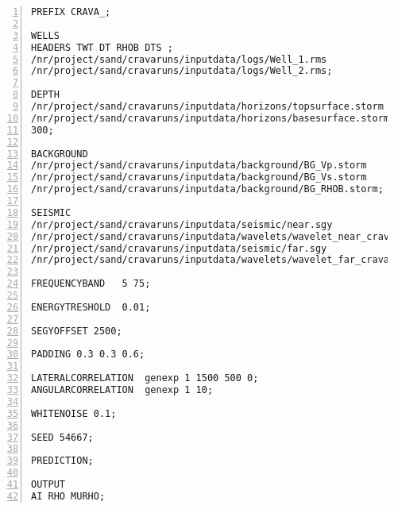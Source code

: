 \documentclass[screen,note,long,backref,indentpar]{nrdoc}
\begin{document}
\begin{small}
\begin{Verbatim}[numbers=left]
PREFIX CRAVA_;

WELLS
HEADERS TWT DT RHOB DTS ;
/nr/project/sand/cravaruns/inputdata/logs/Well_1.rms
/nr/project/sand/cravaruns/inputdata/logs/Well_2.rms;

DEPTH
/nr/project/sand/cravaruns/inputdata/horizons/topsurface.storm
/nr/project/sand/cravaruns/inputdata/horizons/basesurface.storm
300;

BACKGROUND
/nr/project/sand/cravaruns/inputdata/background/BG_Vp.storm
/nr/project/sand/cravaruns/inputdata/background/BG_Vs.storm
/nr/project/sand/cravaruns/inputdata/background/BG_RHOB.storm;

SEISMIC
/nr/project/sand/cravaruns/inputdata/seismic/near.sgy                  15 .35
/nr/project/sand/cravaruns/inputdata/wavelets/wavelet_near_crava.txt             -0.80
/nr/project/sand/cravaruns/inputdata/seismic/far.sgy                   40 .39
/nr/project/sand/cravaruns/inputdata/wavelets/wavelet_far_crava.txt              -0.90;

FREQUENCYBAND   5 75;

ENERGYTRESHOLD  0.01;

SEGYOFFSET 2500;

PADDING 0.3 0.3 0.6;

LATERALCORRELATION  genexp 1 1500 500 0;
ANGULARCORRELATION  genexp 1 10;

WHITENOISE 0.1;

SEED 54667;

PREDICTION;

OUTPUT
AI RHO MURHO;
\end{Verbatim}
\end{small}



\end{document}
